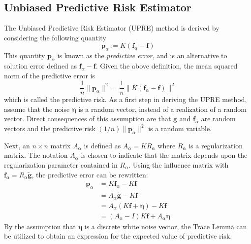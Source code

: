 \documentclass[12pt]{article}
\newcommand{\gdis}{\mathbf{g}}
\newcommand{\gnoise}{\widetilde{\mathbf{g}}}
\newcommand{\kmat}{K}	%
\newcommand{\fdis}{\mathbf{f}}
\newcommand{\regparam}{\alpha}
\newcommand{\R}{R_{\regparam}}	%
\newcommand{\freg}{\fdis_{\regparam}}	%
\newcommand{\noise}{\bm{\eta}}	%
\newcommand{\PE}{\mathbf{p}_{\regparam}}	%
\newcommand{\A}{A_{\regparam}}	%
\begin{document}
\subsection{Unbiased Predictive Risk Estimator} \label{sec:Unbiased Predictive Risk Estimator}
The Unbiased Predictive Risk Estimator (UPRE) method is derived by considering the following quantity
\[\PE := \kmat(\freg - \fdis)\]
This quantity $\PE$ is known as the \textit{predictive error}, and is an alternative to solution error defined as $\freg - \fdis$. Given the above definition, the mean squared norm of the predictive error is
\[\frac{1}{n}\|\PE\|^2 = \frac{1}{n}\|\kmat(\freg - \fdis)\|^2\]
which is called the predictive risk.  As a first step in deriving the UPRE method, assume that the noise $\noise$ is a random vector, instead of a realization of a random vector. Direct consequences of this assumption are that $\gdis$ and $\freg$ are random vectors and the predictive risk $(1/n)\|\PE\|^2$ is a random variable. \par
Next, an $n \times n$ matrix $\A$ is defined as $\A = \kmat\R$ where $\R$ is a regularization matrix. The notation $\A$ is chosen to indicate that the matrix depends upon the regularization parameter contained in $\R$. Using the influence matrix with $\freg = \R\gnoise$, the predictive error can be rewritten:
\begin{align*}
\PE &= \kmat\freg - \kmat\fdis \\
&= \A\gnoise - \kmat\fdis \\
&= \A(\kmat\fdis + \noise) - \kmat\fdis \\
&= (\A - I)\kmat\fdis + \A\noise
\end{align*}
By the assumption that $\noise$ is a discrete white noise vector, the Trace Lemma can be utilized to obtain an expression for the expected value of predictive risk.
\end{document}
